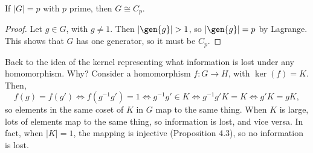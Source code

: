 \begin{theorem}
\corlabel

If $\vert G\vert = p$ with $p$ prime, then $G\cong C_p$.
\end{theorem}
\begin{proof}
Let $g\in G$, with $g\neq 1$. Then $\vert \gen{g}\vert>1$, so $\vert \gen{g}\vert=p$ by Lagrange. This shows that $G$ has one generator, so it must be $C_p$.
\end{proof}

Back to the idea of the kernel representing what information is lost under any homomorphism. Why? Consider a homomorphism $f: G\rightarrow H$, with $\ker(f)=K$. Then,
\[f(g)=f(g') \iff f(g^{-1}g')=1\iff g^{-1}g'\in K\iff g^{-1}g'K=K\iff g'K=gK,\]
so elements in the same coset of $K$ in $G$ map to the same thing. When $K$ is large, lots of elements map to the same thing, so information is lost, and vice versa. In fact, when $\vert K\vert=1$, the mapping is injective (Proposition 4.3), so no information is lost. 


